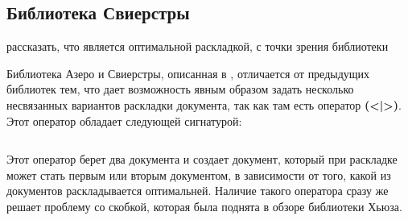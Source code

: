 \newpage

\subsection{Библиотека Свиерстры}

рассказать, что является оптимальной раскладкой, с точки зрения библиотеки

Библиотека Азеро и Свиерстры, описанная в \cite{swierstra}, отличается от предыдущих библиотек тем, что дает возможность явным образом задать несколько несвязанных вариантов раскладки документа, так как там есть оператор \textbf{(<|>)}. Этот оператор обладает следующей сигнатурой:
\inputminted{haskell}{codes/chooseSw.hs}
Этот оператор берет два документа и создает документ, который при раскладке может стать первым или вторым документом, в зависимости от того, какой из документов раскладывается оптимальней. Наличие такого оператора сразу же решает проблему со скобкой, которая была поднята в обзоре библиотеки Хьюза.